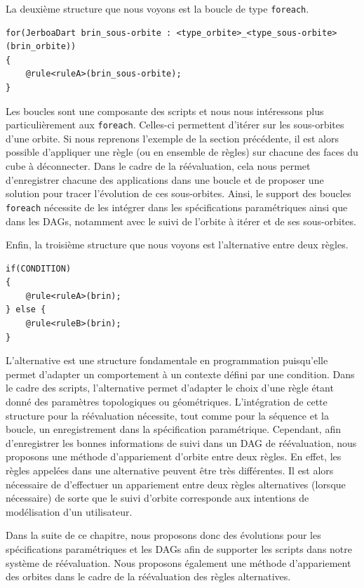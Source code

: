 La deuxième structure que nous voyons est la boucle de type \texttt{foreach}. %
\begin{lstlisting}[style=script-style,language=jerboa-script]
for(JerboaDart brin_sous-orbite : <type_orbite>_<type_sous-orbite>(brin_orbite))
{
    @rule<ruleA>(brin_sous-orbite);
}
\end{lstlisting}
Les boucles sont une composante des scripts et nous nous intéressons plus
particulièrement aux \texttt{foreach}. %
Celles-ci permettent d'itérer sur les sous-orbites d'une orbite. %
Si nous reprenons l'exemple de la section précédente, il est alors possible
d'appliquer une règle (ou en ensemble de règles) sur chacune des faces du cube à
déconnecter. %
Dans le cadre de la réévaluation, cela nous permet d'enregistrer chacune des
applications dans une boucle et de proposer une solution pour tracer l'évolution
de ces sous-orbites. %
Ainsi, le support des boucles \texttt{foreach} nécessite de les intégrer dans
les spécifications paramétriques ainsi que dans les DAGs, notamment avec le
suivi de l'orbite à itérer et de ses sous-orbites. %

Enfin, la troisième structure que nous voyons est l'alternative entre deux
règles. %
\begin{lstlisting}[style=script-style,language=jerboa-script]
if(CONDITION)
{
    @rule<ruleA>(brin);
} else {
    @rule<ruleB>(brin);
}
\end{lstlisting}
L'alternative est une structure fondamentale en programmation puisqu'elle permet
d'adapter un comportement à un contexte défini par une condition. %
Dans le cadre des scripts, l'alternative permet d'adapter le choix d'une règle
étant donné des paramètres topologiques ou géométriques. %
L'intégration de cette structure pour la réévaluation nécessite, tout comme pour
la séquence et la boucle, un enregistrement dans la spécification
paramétrique. %
Cependant, afin d'enregistrer les bonnes informations de suivi dans un DAG de
réévaluation, nous proposons une méthode d'appariement d'orbite entre deux
règles. %
En effet, les règles appelées dans une alternative peuvent être très
différentes. %
Il est alors nécessaire de d'effectuer un appariement entre deux règles
alternatives (lorsque nécessaire) de sorte que le suivi d'orbite corresponde aux
intentions de modélisation d'un utilisateur. %

Dans la suite de ce chapitre, nous proposons donc des évolutions pour les
spécifications paramétriques et les DAGs afin de supporter les scripts dans
notre système de réévaluation. %
Nous proposons également une méthode d'appariement des orbites dans le cadre de
la réévaluation des règles alternatives. %

